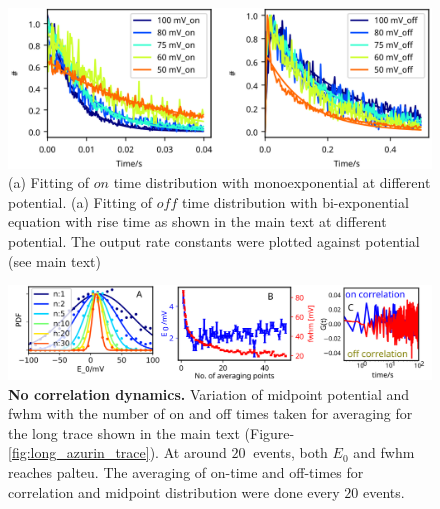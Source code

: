 \begin{figure}
  \centering
  \includegraphics[width=\textwidth]{rate_fit_all_potential}
  \makeatletter
  \renewcommand{\fnum@figure}{\figurename~S\thefigure}
  \makeatother
  \caption{(a) Fitting of $on$ time distribution with monoexponential at different potential.
  (a) Fitting of $off$ time distribution with bi-exponential equation with rise time as shown in the main text at different potential.
  The output rate constants were plotted against potential (see main text)}
  \label{SIfig: rate_fit_all_potential}
\end{figure}
\begin{figure}
  \centering
  \includegraphics[width=\textwidth]{N_avgpoints_vs_fwhmwidth}
  \makeatletter
  \renewcommand{\fnum@figure}{\figurename~S\thefigure}
  \makeatother
  \caption{\textbf{No correlation dynamics.} Variation of midpoint potential and fwhm with the number of on and off times taken for averaging for the long trace shown in the main text (Figure-\ref{fig:long_azurin_trace}). At around $20~$ events, both $E_0$ and fwhm reaches palteu.
  The averaging of on-time and off-times for correlation and midpoint distribution were done every $20$ events.}
  \label{fig: N_avgpoints_vs_fwhmwidth}
\end{figure}
